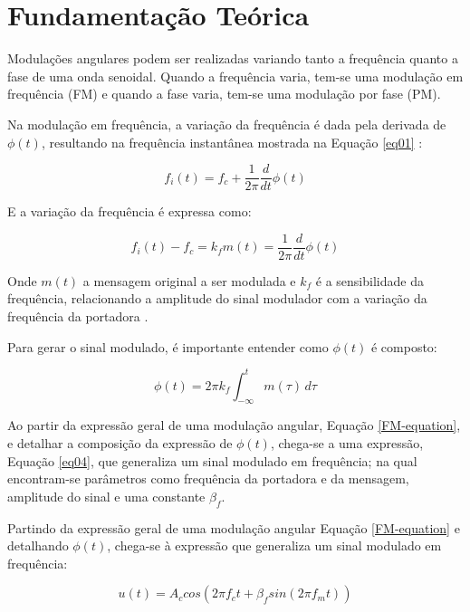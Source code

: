 \section{Fundamentação Teórica}
Modulações angulares podem ser realizadas variando tanto a frequência quanto a fase de uma onda senoidal. Quando a frequência varia, tem-se uma modulação em frequência (FM) e quando a fase varia, tem-se uma modulação por fase (PM).
\par
Na modulação em frequência, a variação da frequência é dada pela derivada de $\phi(t)$, resultando na frequência instantânea mostrada na Equação \ref{eq01} \cite{proakis}:

\begin{equation}
    f_i(t) = f_c + \frac{1}{2\pi}\frac{d}{dt} \phi(t)
    \label{eq01}
\end{equation}

E a variação da frequência é expressa como:

\begin{equation}
    f_i(t) - f_c = k_f m(t) = \frac{1}{2\pi}\frac{d}{dt} \phi(t)
    \label{eq02}
\end{equation}

Onde $m(t)$ a mensagem original a ser modulada e $k_f$ é a sensibilidade da frequência, relacionando a amplitude do sinal modulador com a variação da frequência da portadora \cite{proakis}. 

Para gerar o sinal modulado, é importante entender como $\phi(t)$ é composto:

\begin{equation}
    \phi(t) = 2\pi k_f \int_{-\infty}^{t} m(\tau) \,d\tau
    \label{eq03}
\end{equation}

Ao partir da expressão geral de uma modulação angular, Equação \ref{FM-equation}, e detalhar a composição da expressão de $\phi(t)$, chega-se a uma expressão, Equação \ref{eq04},  que generaliza um sinal modulado em frequência; na qual encontram-se parâmetros como frequência da portadora e da mensagem, amplitude do sinal e uma constante $\beta_f$.

Partindo da expressão geral de uma modulação angular Equação \ref{FM-equation} e detalhando $\phi(t)$, chega-se à expressão que generaliza um sinal modulado em frequência:

\begin{equation}
    u(t) = A_ccos(2\pi f_ct + \beta_f sin(2\pi f_m t))
    \label{eq04}
\end{equation}

